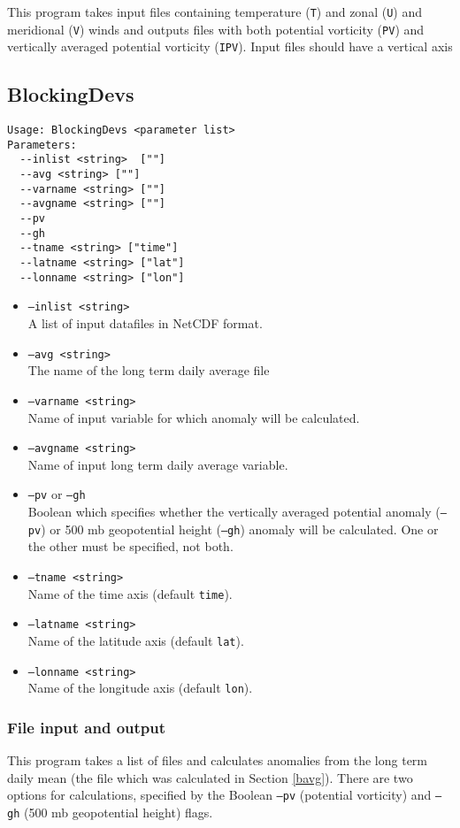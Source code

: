 \documentclass{article}
\begin{document}
This program takes input files containing temperature (\texttt{T}) and zonal (\texttt{U}) and meridional (\texttt{V}) winds and outputs files with both potential vorticity (\texttt{PV}) and vertically averaged potential vorticity (\texttt{IPV}). Input files should have a vertical axis 

\subsection{BlockingDevs}\label{dev}
\begin{verbatim}
Usage: BlockingDevs <parameter list>
Parameters:
  --inlist <string>  [""]
  --avg <string> [""]
  --varname <string> [""]
  --avgname <string> [""]
  --pv
  --gh
  --tname <string> ["time"]
  --latname <string> ["lat"]
  --lonname <string> ["lon"]
\end{verbatim}

\begin{itemize}
\item[]\texttt{--inlist <string>} \\ A list of input datafiles in NetCDF format. 
\item[] \texttt{--avg <string>}\\ The name of the long term daily average file 
\item[] \texttt{--varname <string>}\\Name of input variable for which anomaly will be calculated.
\item[]\texttt{--avgname <string>}\\Name of input long term daily average variable.
\item[]\texttt{--pv} or \texttt{--gh}\\Boolean which specifies whether the vertically averaged potential anomaly (\texttt{--pv}) or 500 mb geopotential height (\texttt{--gh}) anomaly will be calculated. One or the other must be specified, not both.
\item[] \texttt{--tname <string>}\\Name of the time axis (default \texttt{time}).
\item[]\texttt{--latname <string>}\\Name of the latitude axis (default \texttt{lat}).
\item[]\texttt{--lonname <string>}\\Name of the longitude axis (default \texttt{lon}).
\end{itemize}

\subsubsection{File input and output}
This program takes a list of files and calculates anomalies from the long term daily mean (the file which was calculated in Section \ref{bavg}). There are two options for calculations, specified by the Boolean \texttt{--pv} (potential vorticity) and \texttt{--gh} (500 mb geopotential height) flags. 
\end{document}
